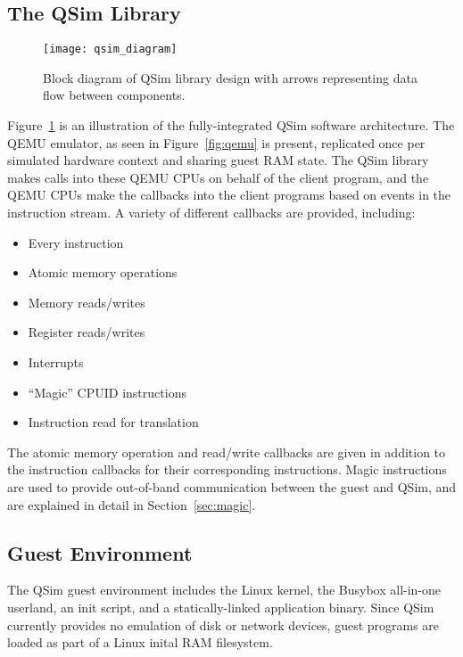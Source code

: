 \documentclass[letterpaper, 10pt]{book}
\begin{document}
\subsection{The QSim Library}

\begin{figure}
\begin{center}
\texttt{[image: qsim\_diagram]}
\caption{Block diagram of QSim library design with arrows representing data flow
         between components.}
\label{fig:qsim}
\end{center}
\end{figure}

Figure~\ref{fig:qsim} is an illustration of the fully-integrated QSim software
architecture. The QEMU emulator, as seen in Figure~\ref{fig:qemu} is present,
replicated once per simulated hardware context and sharing guest RAM state. The
QSim library makes calls into these QEMU CPUs on behalf of the client program,
and the QEMU CPUs make the callbacks into the client programs based on events in
the instruction stream. A variety of different callbacks are provided,
including:

\begin{itemize}
  \item{Every instruction}
  \item{Atomic memory operations}
  \item{Memory reads/writes}
  \item{Register reads/writes}
  \item{Interrupts}
  \item{``Magic'' CPUID instructions}
  \item{Instruction read for translation}
\end{itemize}

The atomic memory operation and read/write callbacks are given in addition to
the instruction callbacks for their corresponding instructions. Magic
instructions are used to provide out-of-band communication between the guest and
QSim, and are explained in detail in Section~\ref{sec:magic}.

\subsection{Guest Environment}

The QSim guest environment includes the Linux kernel, the Busybox all-in-one
userland, an init script, and a statically-linked application binary. Since QSim
currently provides no emulation of disk or network devices, guest programs are
loaded as part of a Linux inital RAM filesystem.
\end{document}
